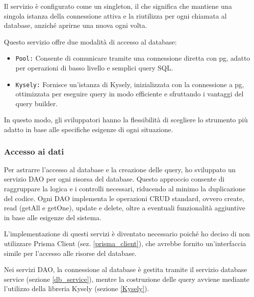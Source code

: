 Il servizio è configurato come un singleton, il che significa che mantiene una singola istanza della connessione attiva e la riutilizza per ogni chiamata al database, anziché aprirne una nuova ogni volta.

Questo servizio offre due modalità di accesso al database:

\begin{itemize}
    \item \texttt{Pool:} Consente di comunicare tramite una connessione diretta con pg, adatto per operazioni di basso livello e semplici query SQL.
    \item \texttt{Kysely:} Fornisce un'istanza di Kysely, inizializzata con la connessione a pg, ottimizzata per eseguire query in modo efficiente e sfruttando i vantaggi del query builder.
\end{itemize}

In questo modo, gli sviluppatori hanno la flessibilità di scegliere lo strumento più adatto in base alle specifiche esigenze di ogni situazione.



\subsubsection{Accesso ai dati}
\label{dao}
Per astrarre l'accesso al database e la creazione delle query, ho sviluppato un servizio DAO per ogni risorsa del database. Questo approccio consente di raggruppare la logica e i controlli necessari, riducendo al minimo la duplicazione del codice. Ogni DAO implementa le operazioni CRUD standard, ovvero create, read (getAll e getOne), update e delete, oltre a eventuali funzionalità aggiuntive in base alle esigenze del sistema.

L'implementazione di questi servizi è diventato necessario poiché ho deciso di non utilizzare Prisma Client (sez. \ref{prisma_client}), che avrebbe fornito un'interfaccia simile per l'accesso alle risorse del database.

Nei servizi DAO, la connessione al database è gestita tramite il servizio database service (sezione \ref{db_service}), mentre la costruzione delle query avviene mediante l'utilizzo della libreria Kysely (sezione \ref{Kysely}). 

\vspace{0,3cm}

